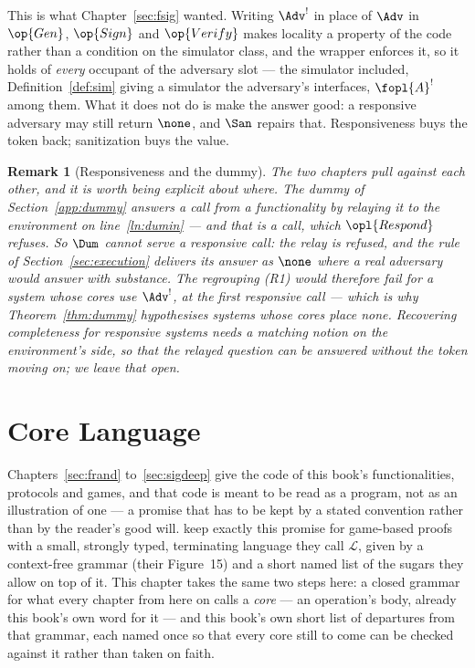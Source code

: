 \documentclass[10pt,oneside,openany]{book}
\theoremstyle{accentdef}
\newtheorem{remark}[definition]{Remark}
\theoremstyle{accentplain}
\begin{document}
This is what Chapter~\ref{sec:fsig} wanted. Writing $\Adv^{!}$ in place of $\Adv$ in $\op{Gen}$,
$\op{Sign}$ and $\op{Verify}$ makes locality a property of the code rather than a condition on the
simulator class, and the wrapper enforces it, so it holds of \emph{every} occupant of the
adversary slot --- the simulator included, Definition~\ref{def:sim} giving a simulator the
adversary's interfaces, $\fopl{A}^{!}$ among them. What it does not do is make the answer good: a responsive adversary may still return
$\none$, and $\San$ repairs that. Responsiveness buys the token back; sanitization buys the
value.

\begin{remark}[Responsiveness and the dummy]\label{rem:respdummy}
The two chapters pull against each other, and it is worth being explicit about where. The dummy
of Section~\ref{app:dummy} answers a call from a functionality by relaying it to the environment
on line~\ref{ln:dumin} --- and that is a call, which $\opl{Respond}$ refuses. So $\Dum$ cannot
serve a responsive call: the relay is refused, and the rule of Section~\ref{sec:execution}
delivers its answer as $\none$ where a real adversary would answer with substance. The regrouping
(R1) would therefore fail for a system whose cores use
$\Adv^{!}$, at the first responsive call --- which is why Theorem~\ref{thm:dummy} hypothesises
systems whose cores place none. Recovering completeness for responsive systems needs a matching
notion on the environment's
side, so that the relayed question can be answered without the token moving on; we leave that
open.
\end{remark}

\chapter{Core Language}\label{app:codelang}

Chapters~\ref{sec:frand} to~\ref{sec:sigdeep} give the code of this book's functionalities,
protocols and games, and that code is meant to be read as a program, not as an illustration of
one --- a promise that has to be kept by a stated convention rather than by the reader's good
will. \cite{BR06} keep exactly this promise for game-based proofs with a small, strongly typed,
terminating language they call $\mathcal{L}$, given by a context-free grammar (their Figure~15)
and a short named list of the sugars they allow on top of it. This chapter takes the same two
steps here: a closed grammar for what every chapter from here on calls a \emph{core} --- an
operation's body, already this book's own word for it --- and this book's own short list of
departures from that grammar, each named once so that every core still to come can be checked
against it rather than taken on faith.
\end{document}

